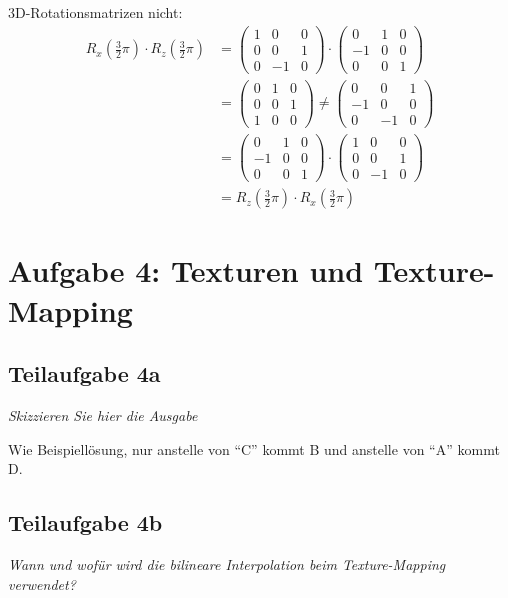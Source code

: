 \documentclass[a4paper]{scrartcl}
\begin{document}
3D-Rotationsmatrizen nicht:
\begin{align}
R_x(\frac{3}{2}\pi) \cdot R_z(\frac{3}{2}\pi)
&= \begin{pmatrix}1 & 0 & 0\\ 0 & 0 & 1\\0 & -1 & 0\end{pmatrix} \cdot
  \begin{pmatrix}0 & 1 & 0\\-1 & 0 & 0\\0 &  0 & 1\end{pmatrix} \\
 &=
  \begin{pmatrix}0 & 1 & 0\\ 0 & 0 & 1\\1 &  0 & 0\end{pmatrix} \neq
  \begin{pmatrix}0 & 0 & 1\\-1 & 0 & 0\\0 & -1 & 0\end{pmatrix} \\
 &=
  \begin{pmatrix}0 & 1 & 0\\-1 & 0 & 0\\0 &  0 & 1\end{pmatrix} \cdot
  \begin{pmatrix}1 & 0 & 0\\ 0 & 0 & 1\\0 & -1 & 0\end{pmatrix} \\
 &= R_z(\frac{3}{2}\pi) \cdot R_x(\frac{3}{2}\pi)
\end{align}

\section*{Aufgabe 4: Texturen und Texture-Mapping}
\subsection*{Teilaufgabe 4a}
\textit{Skizzieren Sie hier die Ausgabe}

Wie Beispiellösung, nur anstelle von \enquote{C} kommt B und anstelle von \enquote{A}
kommt D.

\subsection*{Teilaufgabe 4b}
\textit{Wann und wofür wird die bilineare Interpolation beim Texture-Mapping verwendet?}
\end{document}
